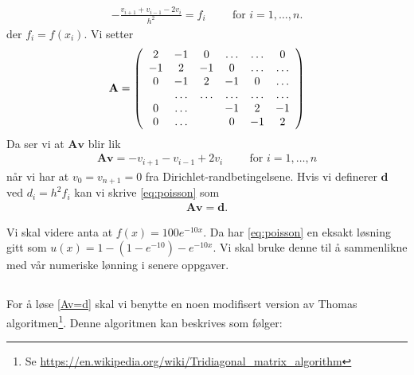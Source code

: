 \documentclass[11pt]{article}
\numberwithin{figure}{section} %
\numberwithin{table}{section} %
\renewcommand{\vec}{\mathbf} %
\begin{document}
\begin{align}
  - \frac{ v_{i+1} + v_{i-1} - 2v_i }{ h^2 } =
  f_i\hspace{1cm}\text{for } i = 1,\dots,n.
\end{align}
der $f_i = f(x_i)$. Vi setter 
\begin{align*}
      {\bf A} = \left(\begin{array}{cccccc}
                           2& -1& 0 &\dots   & \dots &0 \\
                           -1 & 2 & -1 &0 &\dots &\dots \\
                           0&-1 &2 & -1 & 0 & \dots \\
                           & \dots   & \dots &\dots   &\dots & \dots \\
                           0&\dots   &  &-1 &2& -1 \\
                           0&\dots    &  & 0  &-1 & 2 \\
                      \end{array} \right)
\end{align*}
Da ser vi at $\vec A \vec v$ blir lik 
\begin{align*}
  \vec A \vec v = -v_{i+1} - v_{i-1} + 2v_i\hspace{1cm}\text{for } i = 1,\dots,n
\end{align*}
når vi har at $v_0 = v_{n+1} = 0$ fra Dirichlet-randbetingelsene. Hvis
vi definerer $\vec d$ ved $d_i = h^2f_i$ kan vi skrive
\eqref{eq:poisson} som 
\begin{align}
  \vec A \vec v = \vec d.\label{Av=d}
\end{align}
 

Vi skal videre anta at $f(x) = 100 e^{-10x}$. Da har
\eqref{eq:poisson} en eksakt løsning gitt som $u(x) = 1 -
\left(1-e^{-10}\right) - e^{-10x}$. Vi skal bruke denne til å
sammenlikne med vår numeriske lønning i senere oppgaver.

\subsection{}
For å løse \eqref{Av=d} skal vi benytte en noen modifisert version av
Thomas algoritmen\footnote{Se
  \url{https://en.wikipedia.org/wiki/Tridiagonal_matrix_algorithm}}. Denne
algoritmen kan beskrives som følger: 
\end{document}
